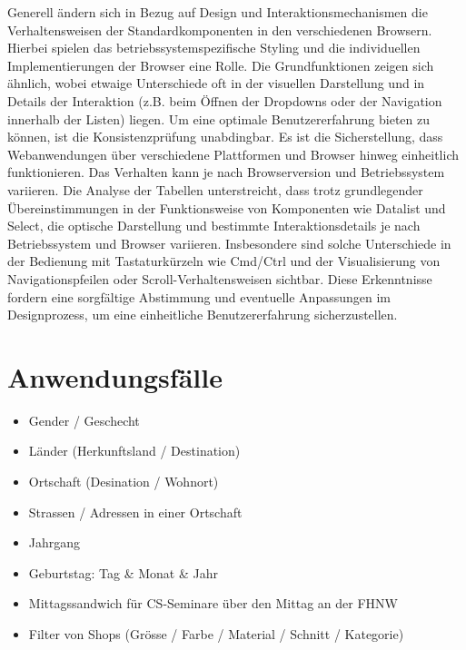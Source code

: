 Generell ändern sich in Bezug auf Design und Interaktionsmechanismen die Verhaltensweisen der Standardkomponenten in den verschiedenen Browsern. 
Hierbei spielen das betriebssystemspezifische Styling und die individuellen Implementierungen der Browser eine Rolle. 
Die Grundfunktionen zeigen sich ähnlich, wobei etwaige Unterschiede oft in der visuellen Darstellung und in Details der Interaktion (z.B. beim Öffnen der Dropdowns oder der Navigation innerhalb der Listen) liegen. 
Um eine optimale Benutzererfahrung bieten zu können, ist die Konsistenzprüfung unabdingbar.
Es ist die Sicherstellung, dass Webanwendungen über verschiedene Plattformen und Browser hinweg einheitlich funktionieren. 
Das Verhalten kann je nach Browserversion und Betriebssystem variieren. 
Die Analyse der Tabellen unterstreicht, dass trotz grundlegender Übereinstimmungen in der Funktionsweise von Komponenten wie Datalist und Select, 
die optische Darstellung und bestimmte Interaktionsdetails je nach Betriebssystem und Browser variieren. 
Insbesondere sind solche Unterschiede in der Bedienung mit Tastaturkürzeln wie Cmd/Ctrl und der Visualisierung von Navigationspfeilen oder Scroll-Verhaltensweisen sichtbar. 
Diese Erkenntnisse fordern eine sorgfältige Abstimmung und eventuelle Anpassungen im Designprozess, um eine einheitliche Benutzererfahrung sicherzustellen.


\section{Anwendungsfälle}
\begin{itemize}
    \item Gender / Geschecht
    \item Länder (Herkunftsland / Destination)
    \item Ortschaft (Desination / Wohnort)
    \item Strassen / Adressen in einer Ortschaft
    \item Jahrgang
    \item Geburtstag: Tag \& Monat \& Jahr
    \item Mittagssandwich für CS-Seminare über den Mittag an der FHNW
    \item Filter von Shops (Grösse / Farbe / Material / Schnitt / Kategorie)
\end{itemize}
